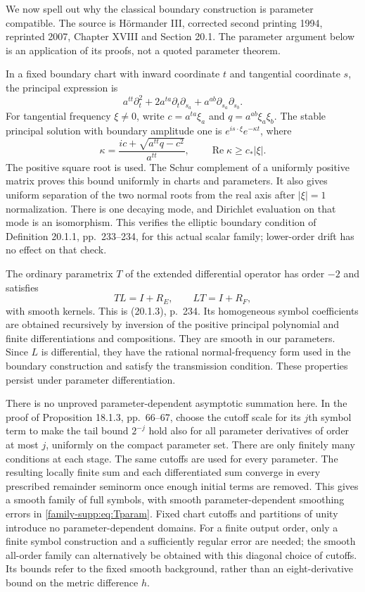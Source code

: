 \documentclass[11pt]{article}
\theoremstyle{definition}
\theoremstyle{remark}
\numberwithin{equation}{section}
\begin{document}
We now spell out why the classical boundary construction is parameter
compatible. The source is H\"ormander III, corrected second printing 1994,
reprinted 2007, Chapter XVIII and Section 20.1. The parameter argument
below is an application of its proofs, not a quoted parameter theorem.

In a fixed boundary chart with inward coordinate $t$ and tangential
coordinate $s$, the principal expression is
\[
 a^{tt}\partial_t^2+2a^{ta}\partial_t\partial_{s_a}
                              +a^{ab}\partial_{s_a}\partial_{s_b}.
\]
For tangential frequency $\xi\ne0$, write
$c=a^{ta}\xi_a$ and $q=a^{ab}\xi_a\xi_b$. The stable principal solution
with boundary amplitude one is $e^{is\cdot\xi}e^{-\kappa t}$, where
\begin{equation}\label{family-supp:eq:root}
 \kappa=\frac{ic+\sqrt{a^{tt}q-c^2}}{a^{tt}},
 \qquad \operatorname{Re}\kappa\geq c_*|\xi|.
\end{equation}
The positive square root is used. The Schur complement of a uniformly
positive matrix proves this bound uniformly in charts and parameters.
It also gives uniform separation of the two normal roots from the real
axis after $|\xi|=1$ normalization. There is one decaying mode, and
Dirichlet evaluation on that mode is an isomorphism. This verifies the
elliptic boundary condition of Definition 20.1.1, pp.~233--234, for this
actual scalar family; lower-order drift has no effect on that check.

The ordinary parametrix $T$ of the extended differential operator has
order $-2$ and satisfies
\begin{equation}\label{family-supp:eq:Tparam}
 TL=I+R_E,\qquad LT=I+R_F,
\end{equation}
with smooth kernels. This is (20.1.3), p.~234. Its homogeneous symbol
coefficients are obtained recursively by inversion of the positive
principal polynomial and finite differentiations and compositions.
They are smooth in our parameters. Since $L$ is differential, they have
the rational normal-frequency form used in the boundary construction
and satisfy the transmission condition. These properties persist under
parameter differentiation.

There is no unproved parameter-dependent asymptotic summation here.
In the proof of Proposition 18.1.3, pp.~66--67, choose the cutoff scale
for its $j$th symbol term to make the tail bound $2^{-j}$ hold also for
all parameter derivatives of order at most $j$, uniformly on the compact
parameter set. There are only finitely many conditions at each stage.
The same cutoffs are used for every parameter. The resulting locally
finite sum and each differentiated sum converge in every prescribed
remainder seminorm once enough initial terms are removed. This gives
a smooth family of full symbols, with smooth parameter-dependent
smoothing errors in \eqref{family-supp:eq:Tparam}. Fixed chart cutoffs and partitions
of unity introduce no parameter-dependent domains. For a finite output
order, only a finite symbol construction and a sufficiently regular error
are needed; the smooth all-order family can alternatively be obtained
with this diagonal choice of cutoffs. Its bounds refer to the fixed
smooth background, rather than an eight-derivative bound on the metric
difference $h$.
\end{document}
